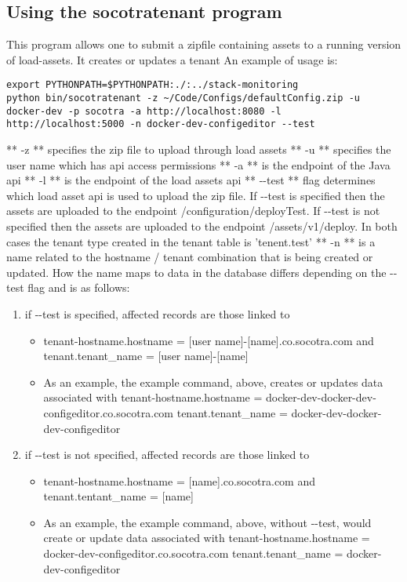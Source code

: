 \hypertarget{using-the-socotratenant-program}{%
\subsection{Using the socotratenant
program}\label{using-the-socotratenant-program}}

This program allows one to submit a zipfile containing assets to a
running version of load-assets. It creates or updates a tenant An
example of usage is:

\begin{verbatim}
export PYTHONPATH=$PYTHONPATH:./:../stack-monitoring
python bin/socotratenant -z ~/Code/Configs/defaultConfig.zip -u docker-dev -p socotra -a http://localhost:8080 -l http://localhost:5000 -n docker-dev-configeditor --test
\end{verbatim}

** -z ** specifies the zip file to upload through load assets ** -u **
specifies the user name which has api access permissions ** -a ** is the
endpoint of the Java api ** -l ** is the endpoint of the load assets api
** -\/-test ** flag determines which load asset api is used to upload
the zip file. If -\/-test is specified then the assets are uploaded to
the endpoint /configuration/deployTest. If -\/-test is not specified
then the assets are uploaded to the endpoint /assets/v1/deploy. In both
cases the tenant type created in the tenant table is 'tenent.test' ** -n
** is a name related to the hostname / tenant combination that is being
created or updated. How the name maps to data in the database differs
depending on the -\/-test flag and is as follows:

\begin{enumerate}
\def\labelenumi{\arabic{enumi}.}
\tightlist
\item
  if -\/-test is specified, affected records are those linked to

  \begin{itemize}
  \tightlist
  \item
    tenant-hostname.hostname = {[}user name{]}-{[}name{]}.co.socotra.com
    and tenant.tenant\_name = {[}user name{]}-{[}name{]}
  \item
    As an example, the example command, above, creates or updates data
    associated with tenant-hostname.hostname =
    docker-dev-docker-dev-configeditor.co.socotra.com
    tenant.tenant\_name = docker-dev-docker-dev-configeditor
  \end{itemize}
\item
  if -\/-test is not specified, affected records are those linked to

  \begin{itemize}
  \tightlist
  \item
    tenant-hostname.hostname = {[}name{]}.co.socotra.com and
    tenant.tentant\_name = {[}name{]}
  \item
    As an example, the example command, above, without -\/-test, would
    create or update data associated with tenant-hostname.hostname =
    docker-dev-configeditor.co.socotra.com tenant.tenant\_name =
    docker-dev-configeditor
  \end{itemize}
\end{enumerate}

